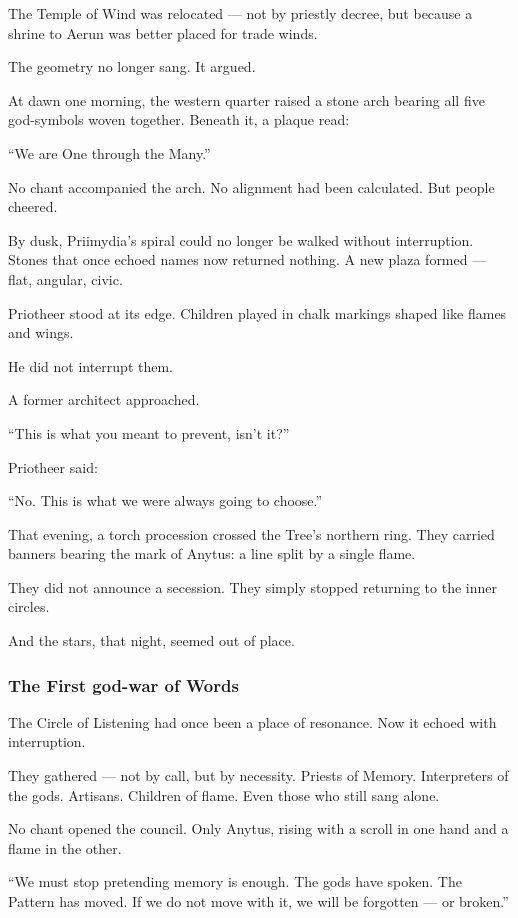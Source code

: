\documentclass[12pt]{article}
\begin{document}
The Temple of Wind was relocated — not by priestly decree,  
but because a shrine to Aerun was better placed for trade winds.

The geometry no longer sang.  
It argued.

At dawn one morning, the western quarter raised a stone arch  
bearing all five god-symbols woven together.  
Beneath it, a plaque read:

 “We are One through the Many.”

No chant accompanied the arch.  
No alignment had been calculated.  
But people cheered.

By dusk, Priimydia’s spiral could no longer be walked without interruption.  
Stones that once echoed names now returned nothing.  
A new plaza formed — flat, angular, civic.

Priotheer stood at its edge.  
Children played in chalk markings shaped like flames and wings.

He did not interrupt them.

A former architect approached.

 “This is what you meant to prevent, isn’t it?”

Priotheer said:

 “No. This is what we were always going to choose.”

That evening, a torch procession crossed the Tree’s northern ring.  
They carried banners bearing the mark of Anytus:  
a line split by a single flame.

They did not announce a secession.  
They simply stopped returning to the inner circles.

And the stars, that night, seemed out of place.

\dotfill

\subsubsection*{The First god-war of Words}

The Circle of Listening had once been a place of resonance.  
Now it echoed with interruption.

They gathered — not by call, but by necessity.  
Priests of Memory.  
Interpreters of the gods.  
Artisans. Children of flame.  
Even those who still sang alone.

No chant opened the council.  
Only Anytus, rising with a scroll in one hand and a flame in the other.

 “We must stop pretending memory is enough.  
 The gods have spoken.  
 The Pattern has moved.  
 If we do not move with it, we will be forgotten — or broken.”
\end{document}
